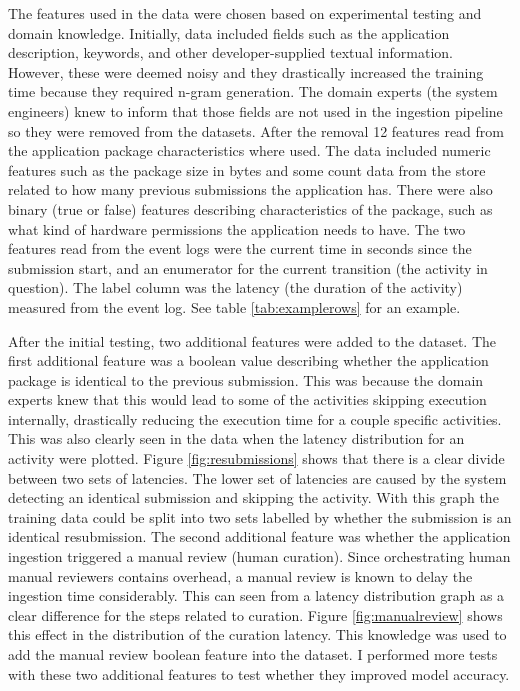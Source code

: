 The features used in the data were chosen based on experimental testing and domain knowledge.
Initially, data included fields such as the application description, keywords, and other developer-supplied textual information. 
However, these were deemed noisy and they drastically increased the training time because they required n-gram generation.
The domain experts (the system engineers) knew to inform that those fields are not used in the ingestion pipeline so they were removed from the datasets.
After the removal 12 features read from the application package characteristics where used. 
The data included numeric features such as the package size in bytes and some count data from the store related to how many previous submissions the application has.
There were also binary (true or false) features describing characteristics of the package, such as what kind of hardware permissions the application needs to have.
The two features read from the event logs were the current time in seconds since the submission start, and an enumerator for the current transition (the activity in question).
The label column was the latency (the duration of the activity) measured from the event log.
See table \ref{tab:examplerows} for an example.

After the initial testing, two additional features were added to the dataset.
The first additional feature was a boolean value describing whether the application package is identical to the previous submission.
This was because the domain experts knew that this would lead to some of the activities skipping execution internally, drastically reducing the execution time for a couple specific activities. 
This was also clearly seen in the data when the latency distribution for an activity were plotted. 
Figure \ref{fig:resubmissions} shows that there is a clear divide between two sets of latencies.
The lower set of latencies are caused by the system detecting an identical submission and skipping the activity.
With this graph the training data could be split into two sets labelled by whether the submission is an identical resubmission.
The second additional feature was whether the application ingestion triggered a manual review (human curation). 
Since orchestrating human manual reviewers contains overhead, a manual review is known to delay the ingestion time considerably.
This can seen from a latency distribution graph as a clear difference for the steps related to curation. 
Figure \ref{fig:manualreview} shows this effect in the distribution of the curation latency.
This knowledge was used to add the manual review boolean feature into the dataset.
I performed more tests with these two additional features to test whether they improved model accuracy.

